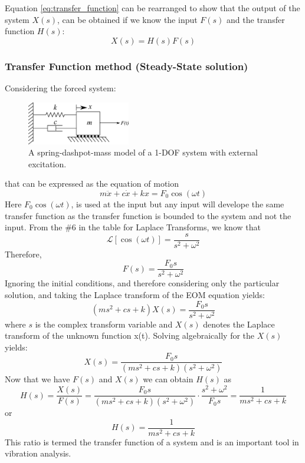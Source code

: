 \documentclass[12pt,letter]{article}
\numberwithin{ex}{section} %
\numberwithin{re}{section} %
\newcommand{\Laplace}[1]{\ensuremath{\mathcal{L}{\left[#1\right]}}}
\begin{document}
Equation \ref{eq:transfer_function} can be rearranged to show that the output of the system $X(s)$, can be obtained if we know the input $F(s)$ and the transfer function $H(s)$:
\begin{equation}
X(s) = H(s)F(s)
\end{equation}	


\subsubsection{Transfer Function method (Steady-State solution)}

Considering the forced system:
\begin{figure}[H]
	\centering
	\includegraphics[width=0.4\textwidth]{../figures/forced_spring_mass_damper_system.png}
	\caption{A spring-dashpot-mass model of a 1-DOF system with external excitation.}
\end{figure}
\noindent that can be expressed as the equation of motion
\begin{equation}
	m\ddot{x} + c\dot{x} +kx = F_0 \cos(\omega t)
\end{equation}
Here $F_0 \cos(\omega t)$, is used at the input but any input will develope the same transfer function as the transfer function is bounded to the system and not the input. From the \#6 in the table for Laplace Transforms, we know that
\begin{equation}
	\Laplace{\cos(\omega t)} = \frac{s}{s^2+\omega^2}
\end{equation}
Therefore, 
\begin{equation}
F(s) = \frac{F_0s}{s^2+\omega^2}
\end{equation}
Ignoring the initial conditions, and therefore considering only the particular solution, and taking the Laplace transform of the EOM equation yields:
\begin{equation}
(ms^2 + cs +k)X(s) = \frac{F_0s}{s^2+\omega^2} 
\end{equation}
where $s$ is the complex transform variable and $X(s)$ denotes the Laplace transform of the unknown function x(t). Solving algebraically for the $X(s)$ yields: 
\begin{equation}
X(s) = \frac{F_0s}{(ms^2 + cs +k)(s^2+\omega^2)}
\end{equation}
Now that we have $F(s)$ and $X(s)$ we can obtain $H(s)$ as  
\begin{equation}
H(s) = \frac{X(s)}{F(s)} = \frac{F_0s}{(ms^2 + cs +k)(s^2+\omega^2)} \cdot \frac{s^2+\omega^2}{F_0s} = \frac{1}{ms^2+cs+k}
\end{equation}
or 
\begin{equation}
H(s) = \frac{1}{ms^2+cs+k}
\end{equation}
This ratio is termed the transfer function of a system and is an important tool in vibration analysis.
\end{document}
